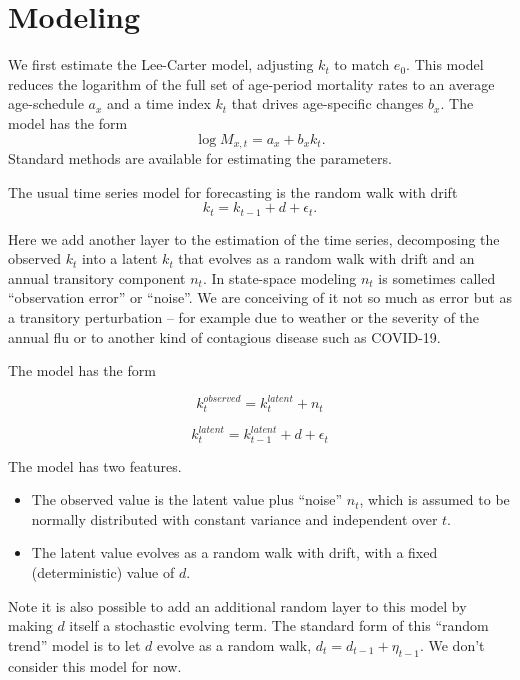 \documentclass[12pt]{article}
\begin{document}
\section{Modeling}

We first estimate the Lee-Carter model, adjusting $k_t$ to match
$e_0$. This model reduces the logarithm of the full set of age-period
mortality rates to an average age-schedule $a_x$ and a time index $k_t$ that
drives age-specific changes $b_x$. The model has the form
$$
\log M_{x,t} = a_x + b_x k_t.
$$
Standard methods are available for estimating the parameters.

The usual time series model for forecasting is the random walk with
drift
$$
k_t = k_{t-1} + d + \epsilon_t.
$$

Here we add another layer to the estimation of the time series,
decomposing the observed $k_t$ into a latent $k_t$ that evolves as a
random walk with drift and an annual transitory component $n_t$. In
state-space modeling $n_t$ is sometimes called ``observation
error'' or ``noise''. We are conceiving of it not so much as error but as a
transitory perturbation -- for example due to weather or the severity
of the annual flu or to another kind of contagious disease such as
COVID-19.

The model has the form

\begin{equation}
  k_t^{observed} = k_t^{latent} + n_t
\end{equation}

\begin{equation}
  k_t^{latent} = k_{t-1}^{latent} + d + \epsilon_t
\end{equation}

The model has two features.
\begin{itemize}
  \item The observed value is the latent value plus ``noise'' $n_t$,
    which is assumed to be normally distributed with constant variance
    and independent over $t$.

  \item The latent value evolves as a random walk with drift, with a
    fixed (deterministic) value of $d$.

\end{itemize}

Note it is also possible to add an additional random layer to this
model by making $d$ itself a stochastic evolving term. The
standard form of this ``random trend'' model is to let $d$ evolve as a
random walk, $d_t = d_{t-1} + \eta_{t-1}$. We don't consider this
model for now.
\end{document}
